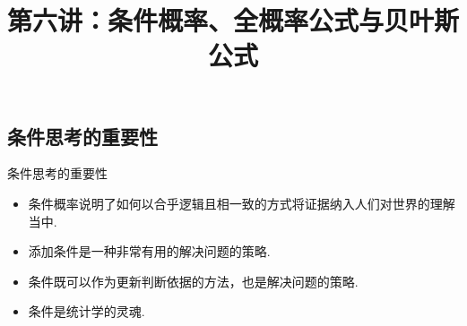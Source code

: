\documentclass[Prob-All.tex]{subfiles}
\begin{document}
\title[概率论]{第六讲：条件概率、全概率公式与贝叶斯公式}
\date{}


{
	\begin{frame}
		\titlepage
	\end{frame}
}


\subsection{条件思考的重要性}%

\begin{frame}{条件思考的重要性}
	\begin{itemize}[<+-|alert@+>]
		\item 条件概率说明了如何以合乎逻辑且相一致的方式将证据纳入人们对世界的理解当中.
        \item 添加条件是一种非常有用的解决问题的策略.
        \item 条件既可以作为更新判断依据的方法，也是解决问题的策略.
        \item 条件是统计学的灵魂.
	\end{itemize}

\end{frame}
\end{document}
